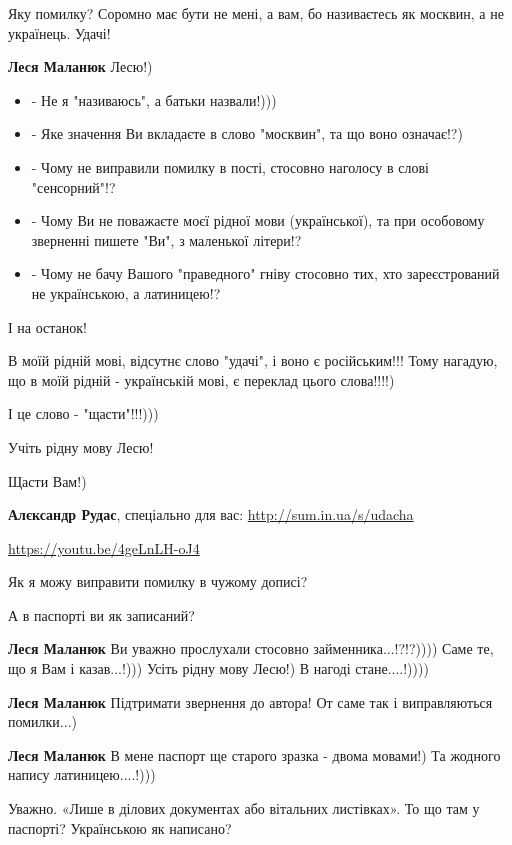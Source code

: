 \begin{itemize}
\begin{itemize} %
Яку помилку? Соромно має бути не мені, а вам, бо називаєтесь як москвин, а не українець. Удачі!

\textbf{Леся Маланюк}
Лесю!)

\begin{itemize}
  \item - Не я "називаюсь", а батьки назвали!)))
  \item - Яке значення Ви вкладаєте в слово "москвин", та що воно означає!?)
  \item - Чому не виправили помилку в пості, стосовно наголосу в слові "сенсорний"!?
  \item - Чому Ви не поважаєте моєї рідної мови (української), та при особовому зверненні пишете "Ви", з маленької літери!?
  \item - Чому не бачу Вашого "праведного" гніву стосовно тих, хто зареєстрований не українською, а латиницею!?
\end{itemize}

І на останок!

В моїй рідній мові, відсутнє слово "удачі", і воно є російським!!! Тому
нагадую, що в моїй рідній - українській мові, є переклад цього слова!!!!)

І це слово - "щасти"!!!)))

Учіть рідну мову Лесю!

Щасти Вам!)

\textbf{Алєксандр Рудас}, спеціально для вас:
\url{http://sum.in.ua/s/udacha}

\url{https://youtu.be/4geLnLH-oJ4}

Як я можу виправити помилку в чужому дописі?

А в паспорті ви як записаний?

\textbf{Леся Маланюк}
Ви уважно прослухали стосовно займенника...!?!?))))
Саме те, що я Вам і казав...!)))
Усіть рідну мову Лесю!)
В нагоді стане....!))))

\textbf{Леся Маланюк}
Підтримати звернення до автора!
От саме так і виправляються помилки...)

\textbf{Леся Маланюк}
В мене паспорт ще старого зразка - двома мовами!)
Та жодного напису латиницею....!)))

Уважно. «Лише в ділових документах або вітальних листівках».
То що там у паспорті? Українською як написано?


\end{itemize}
\end{itemize}
